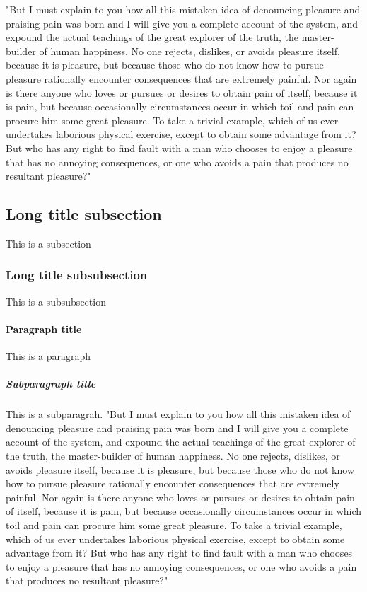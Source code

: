 \begin{refsection}
"But I must explain to you how all this mistaken idea of denouncing pleasure and praising pain was born and I will give you a complete account of the system, and expound the actual teachings of the great explorer of the truth, the master-builder of human happiness. No one rejects, dislikes, or avoids pleasure itself, because it is pleasure, but because those who do not know how to pursue pleasure rationally encounter consequences that are extremely painful. Nor again is there anyone who loves or pursues or desires to obtain pain of itself, because it is pain, but because occasionally circumstances occur in which toil and pain can procure him some great pleasure. To take a trivial example, which of us ever undertakes laborious physical exercise, except to obtain some advantage from it? But who has any right to find fault with a man who chooses to enjoy a pleasure that has no annoying consequences, or one who avoids a pain that produces no resultant pleasure?"

\subsection[SubShort]{Long title subsection}
This is a subsection
\subsubsection[SubSubShort]{Long title subsubsection}
This is a subsubsection
\paragraph{Paragraph title}
This is a paragraph
\subparagraph{Subparagraph title}
This is a subparagrah. "But I must explain to you how all this mistaken idea of denouncing pleasure and praising pain was born and I will give you a complete account of the system, and expound the actual teachings of the great explorer of the truth, the master-builder of human happiness. No one rejects, dislikes, or avoids pleasure itself, because it is pleasure, but because those who do not know how to pursue pleasure rationally encounter consequences that are extremely painful. Nor again is there anyone who loves or pursues or desires to obtain pain of itself, because it is pain, but because occasionally circumstances occur in which toil and pain can procure him some great pleasure. To take a trivial example, which of us ever undertakes laborious physical exercise, except to obtain some advantage from it? But who has any right to find fault with a man who chooses to enjoy a pleasure that has no annoying consequences, or one who avoids a pain that produces no resultant pleasure?"


\end{refsection}
